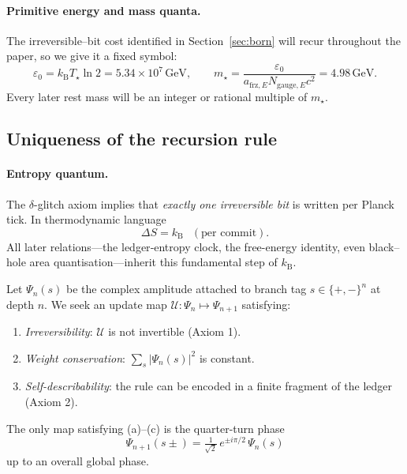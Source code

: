 \paragraph{Primitive energy and mass quanta.}%
The irreversible--bit cost identified in Section~\ref{sec:born} will recur
throughout the paper, so we give it a fixed symbol:
\[
  \boxed{\varepsilon_{0}=k_{\mathrm B}T_{\star}\ln 2
        =5.34\times10^{7}\,\text{GeV}},\qquad
  \boxed{m_{\star}=\frac{\varepsilon_{0}}
                   {a_{\text{frz},E}N_{\text{gauge},E}c^{2}}
          =4.98\,\text{GeV}.}
\]
Every later rest mass will be an integer or rational multiple of $m_{\star}$.%

\subsection{Uniqueness of the recursion rule}

\paragraph{Entropy quantum.}%
The $\delta$-glitch axiom implies that \emph{exactly one irreversible
bit} is written per Planck tick.  In thermodynamic language
\[
  \boxed{\Delta S = k_{\mathrm B}\,\;\; (\text{per commit})}.
\]
All later relations—the ledger‐entropy clock, the free-energy
identity, even black--hole area quantisation—inherit this fundamental
step of $k_{\mathrm B}$.

Let $\Psi_n(s)$ be the complex amplitude attached to branch tag
$s\!\in\!\{+,-\}^n$ at depth $n$.  We seek an update map
$\mathcal U:\Psi_n\mapsto\Psi_{n+1}$ satisfying:

\begin{enumerate}[label=(\alph*)]
  \item \emph{Irreversibility}: $\mathcal U$ is not invertible (Axiom 1).
  \item \emph{Weight conservation}: $\sum_{s}\lvert\Psi_n(s)\rvert^2$
        is constant.
  \item \emph{Self-describability}: the rule can be encoded in a finite
        fragment of the ledger (Axiom 2).
\end{enumerate}

\begin{theorem}[Uniqueness]
The only map satisfying (a)–(c) is the quarter-turn phase
\[
  \boxed{\;
  \Psi_{n+1}(s\pm)=\tfrac{1}{\sqrt 2}\,e^{\pm i\pi/2}\,\Psi_n(s)\;}
\]
up to an overall global phase.
\end{theorem}

